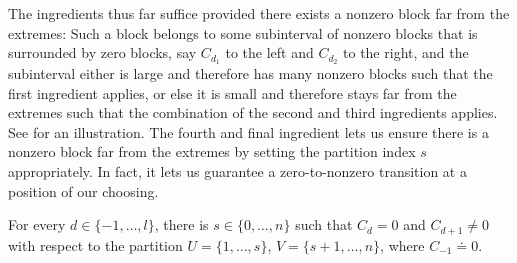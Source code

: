 \documentclass{toc}
\begin{document}
The ingredients thus far suffice provided there exists a nonzero block far from the extremes:
Such a block belongs to some subinterval of nonzero blocks that is surrounded by zero blocks, say $C_{d_1}$ to the left and $C_{d_2}$ to the right, and the subinterval either is large and therefore has many nonzero blocks such that the first ingredient applies, or else it is small and therefore stays far from the extremes such that the combination of the second
and third ingredients applies. See  for an illustration.
The fourth and final ingredient lets us ensure there is a nonzero block far from the extremes by setting the partition index $s$ appropriately.
In fact, it lets us guarantee a zero-to-nonzero transition at a position of our choosing.

\begin{proposition} \label{prop:ROABP:dselect}
  For every $d \in \{-1,\dots,l\}$, there is $s \in \{0,\dots,n\}$ such that $C_d=0$ and $C_{d+1} \ne 0$
  with respect to the partition \(U=\{1,\ldots,s\}\),
  \(V=\{{s+1},\ldots,n\}\), where $C_{-1} \doteq 0$.
\end{proposition}
\end{document}
